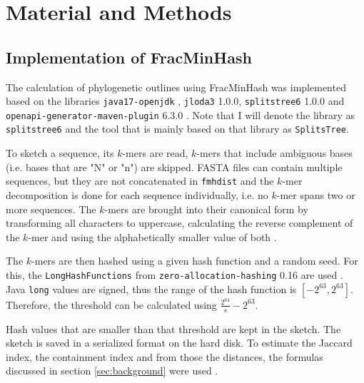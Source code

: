 
\chapter{Material and Methods}
  \label{sec:matmet}

\section{Implementation of FracMinHash}
The calculation of phylogenetic outlines using FracMinHash was implemented based
on the libraries \texttt{java17-openjdk} \cite{theopenjdkcommunityJDK172021},
\texttt{jloda3} 1.0.0, \texttt{splitstree6} 1.0.0
\cite{husonApplicationPhylogeneticNetworks2006} and
\texttt{openapi-generator-maven-plugin} 6.3.0
\cite{openapi-generatorcontributorsOpenAPIGenerator2023}. Note that I will
denote the library as \texttt{splitstree6} and the tool that is mainly based on
that library as \texttt{SplitsTree}.

To sketch a sequence, its $k$-mers are read, $k$-mers that include ambiguous
bases (i.e. bases that are "N" or "n") are skipped. FASTA files can contain
multiple sequences, but they are not concatenated in \texttt{fmhdist} and the
$k$-mer decomposition is done for each sequence individually, i.e. no $k$-mer
spans two or more sequences. The $k$-mers are brought into their canonical form
by transforming all characters to uppercase, calculating the reverse complement
of the $k$-mer and using the alphabetically smaller value of both
\cite{ondovMashFastGenome2016,irberLightweightCompositionalAnalysis2022} .

The $k$-mers are then hashed using a given hash function and a random seed. For
this, the \texttt{LongHashFunctions} from \texttt{zero-allocation-hashing} 0.16
are used \cite{ZeroAllocationHashing2022}. Java \texttt{long} values are signed,
thus the range of the hash function is $[-2^{63}, 2^{63}]$. Therefore, the
threshold can be calculated using $\frac{2^{64}}{s} -2^{63}$. 

Hash values that are smaller than that threshold are kept in the sketch. The
sketch is saved in a serialized format on the hard disk. To estimate the Jaccard
index, the containment index and from those the distances, the formulas
discussed in section \ref{sec:background} were used
\cite{heraDerivingConfidenceIntervals2023,irberLightweightCompositionalAnalysis2022}.

